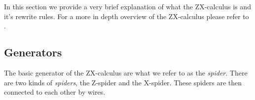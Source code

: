 In this section we provide a very brief explanation of what the ZX-calculus is and it's rewrite rules. For a more in depth overview of the ZX-calculus please refer to \cite{ZX-overview}.

\subsection{Generators}
The basic generator of the ZX-calculus are what we refer to as the \textit{spider}. There are two kinds of \textit{spiders}, the Z-spider and the X-spider. These spiders are then connected to each other by wires.

